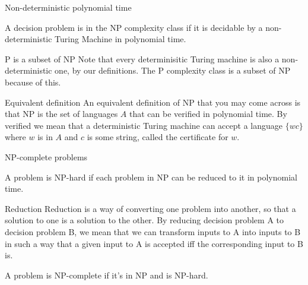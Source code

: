 \documentclass{beamer}
\begin{document}
\begin{frame}{Non-deterministic polynomial time}
  \begin{definition}
    A decision problem is in the NP complexity class if it is decidable by a non-deterministic Turing Machine in polynomial time.
  \end{definition}
  
  \begin{alertblock}{P is a subset of NP}
    Note that every determinisitic Turing machine is also a non-deterministic one, by our definitions.
    The P complexity class is a subset of NP because of this.
  \end{alertblock}

  \begin{alertblock}{Equivalent definition}
    An equivalent definition of NP that you may come across is that NP is the set of languages $A$ that can be verified in polynomial time.
    By verified we mean that a deterministic Turing machine can accept a language $\{ wc \}$ where $w$ is in $A$ and $c$ is some string, called the certificate for $w$.
  \end{alertblock}

\end{frame}


\begin{frame}{NP-complete problems}
  \begin{definition}
    A problem is NP-hard if each problem in NP can be reduced to it in polynomial time.
  \end{definition}

  \begin{alertblock}{Reduction}
    Reduction is a way of converting one problem into another, so that a solution to one is a solution to the other.
    By reducing decision problem A to decision problem B, we mean that we can transform inputs to A into inputs to B in such a way that a given input to A is accepted iff the corresponding input to B is.
  \end{alertblock}

  \begin{definition}
    A problem is NP-complete if it's in NP and is NP-hard.
  \end{definition}
\end{frame}
\end{document}
